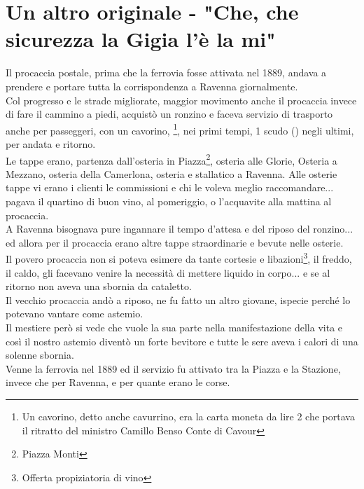 \documentclass[10pt]{memoir} %
\begin{document}
\chapter{Un altro originale - "Che, che sicurezza la Gigia l'è la mi"}
Il procaccia postale, prima che la ferrovia fosse attivata nel 1889, andava a prendere e portare tutta la corrispondenza a Ravenna giornalmente.\\
Col progresso e le strade migliorate, maggior movimento anche il procaccia invece di fare il cammino a piedi, acquistò un ronzino e faceva servizio di trasporto anche per passeggeri, con un cavorino, \normalfont \:\:\footnote{Un cavorino, detto anche cavurrino, era la carta moneta da lire 2 che portava il ritratto del ministro Camillo Benso Conte di Cavour}, nei primi tempi, 1 scudo (\normalfont \:\:) negli ultimi, per andata e ritorno. \\
Le tappe erano, partenza dall'osteria in Piazza\footnote{Piazza Monti}, osteria alle Glorie, Osteria a Mezzano, osteria della Camerlona, osteria e stallatico a Ravenna. Alle osterie tappe vi erano i clienti le commissioni e chi le voleva meglio raccomandare... pagava il quartino di buon vino, al pomeriggio, o l'acquavite alla mattina al procaccia.\\
A Ravenna bisognava pure ingannare il tempo d'attesa e del riposo del ronzino... ed allora per il procaccia erano altre tappe straordinarie e bevute nelle osterie.\\
Il povero procaccia non si poteva esimere da tante cortesie e libazioni\footnote{Offerta propiziatoria di vino}, il freddo, il caldo, gli facevano venire la necessità di mettere liquido in corpo... e se al ritorno non aveva una sbornia da cataletto.\\
Il vecchio procaccia andò a riposo, ne fu fatto un altro giovane, ispecie perché lo potevano vantare come astemio.\\
Il mestiere però si vede che vuole la sua parte nella manifestazione della vita e così il nostro astemio diventò un forte bevitore e tutte le sere aveva i calori di una solenne sbornia.\\
Venne la ferrovia nel 1889 ed il servizio fu attivato tra la Piazza e la Stazione, invece che per Ravenna, e per quante erano le corse.\\
\end{document}

